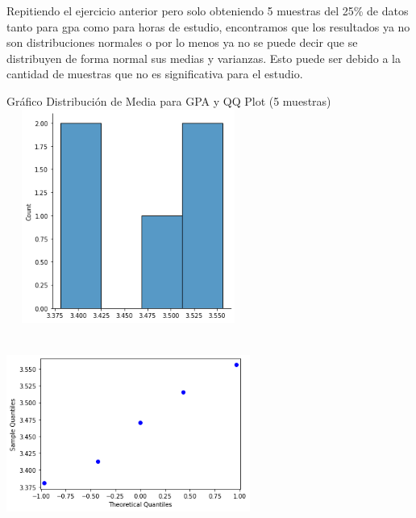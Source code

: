 \documentclass[12pt]{article}
\begin{document}
Repitiendo el ejercicio anterior pero solo obteniendo 5 muestras del 25\% de datos tanto para gpa como para horas de estudio, encontramos que los resultados ya no son distribuciones normales o por lo menos ya no se puede decir que se distribuyen de forma normal sus medias y varianzas. Esto puede ser debido a la cantidad de muestras que no es significativa para el estudio. 


Gráfico Distribución de Media para GPA y QQ Plot (5 muestras)\\
\includegraphics[width=8cm, height=7cm]{gpa_histo1.5}
\includegraphics[width=8cm, height=7cm]{gpa_qq1.5}
\end{document}
